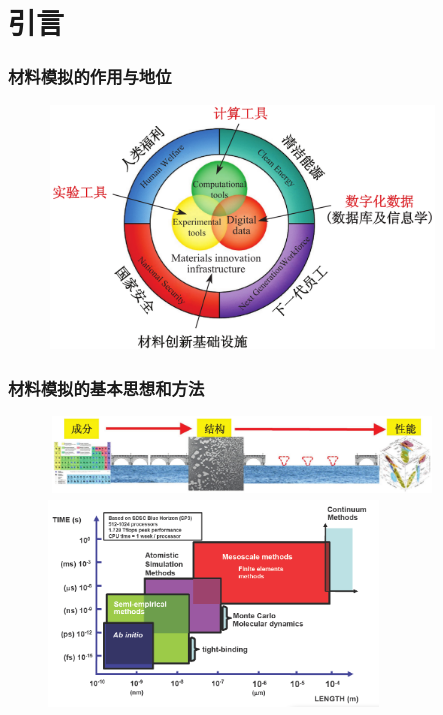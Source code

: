 \small
\section{引言}
\frame
{
	\frametitle{材料模拟的作用与地位}
\begin{figure}[h!]
\vspace*{-0.18in}
\centering
\includegraphics[height=2.55in,width=4.05in]{Figures/MGE.png}
\label{MGE}
\end{figure}
}

\frame
{
	\frametitle{材料模拟的基本思想和方法}
\begin{figure}[h!]
\vspace*{-0.25in}
\centering
\includegraphics[height=0.80in,width=4.05in]{Figures/MGE-2.png}
\vskip 0.05pt
\includegraphics[height=2.20in,width=3.45in]{Figures/Multi-Scale-6.png}
\label{Multi-Scale}
\end{figure}
}

